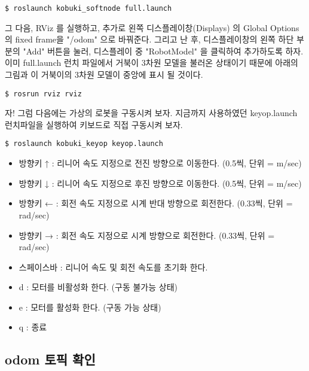 \vspace{\baselineskip}
\begin{lstlisting}[language=ROS]
$ roslaunch kobuki_softnode full.launch
\end{lstlisting}

그 다음, RViz 를 실행하고, 추가로 왼쪽 디스플레이창(Displays) 의 Global Options 의 fixed frame을 "/odom" 으로 바꿔준다. 그리고 난 후, 디스플레이창의 왼쪽 하단 부분의 "Add" 버튼을 눌러, 디스플레이 중 "RobotModel" 을 클릭하여 추가하도록 하자. 이미 full.launch 런치 파일에서 거북이 3차원 모델을 불러온 상태이기 때문에 아래의 그림과 이 거북이의 3차원 모델이 중앙에 표시 될 것이다.

\vspace{\baselineskip}
\begin{lstlisting}[language=ROS]
$ rosrun rviz rviz
\end{lstlisting}

자! 그럼 다음에는 가상의 로봇을 구동시켜 보자. 지금까지 사용하였던 keyop.launch 런치파일을 실행하여 키보드로 직접 구동시켜 보자. 

\vspace{\baselineskip}
\begin{lstlisting}[language=ROS]
$ roslaunch kobuki_keyop keyop.launch
\end{lstlisting}

\begin{itemize}[leftmargin=*]
\item 방향키 ↑ : 리니어 속도 지정으로 전진 방향으로 이동한다. (0.5씩, 단위 = m/sec) 
\item 방향키 ↓ : 리니어 속도 지정으로 후진 방향으로 이동한다. (0.5씩, 단위 = m/sec) 
\item 방향키 ← : 회전 속도 지정으로 시계 반대 방향으로 회전한다. (0.33씩, 단위 = rad/sec) 
\item 방향키 → : 회전 속도 지정으로 시계 방향으로 회전한다. (0.33씩, 단위 = rad/sec) 
\item 스페이스바 : 리니어 속도 및 회전 속도를 초기화 한다.
\item d : 모터를 비활성화 한다. (구동 불가능 상태)
\item e : 모터를 활성화 한다. (구동 가능 상태)
\item q : 종료
\end{itemize}

\subsection{odom 토픽 확인}

